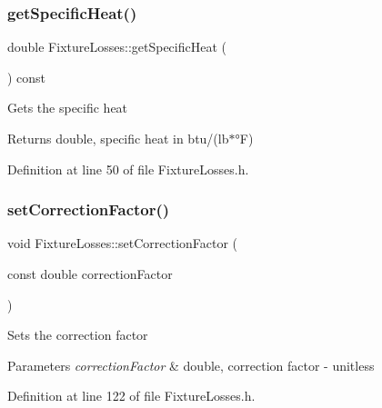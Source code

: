\subsubsection{\texorpdfstring{get\+Specific\+Heat()}{getSpecificHeat()}\hspace{0.1cm}{\footnotesize\ttfamily [3/3]}}
{\footnotesize\ttfamily double Fixture\+Losses\+::get\+Specific\+Heat (\begin{DoxyParamCaption}{ }\end{DoxyParamCaption}) const\hspace{0.3cm}{\ttfamily [inline]}}

Gets the specific heat \begin{DoxyReturn}{Returns}
double, specific heat in btu/(lb$\ast$°F) 
\end{DoxyReturn}


Definition at line 50 of file Fixture\+Losses.\+h.

\mbox{\label{class_fixture_losses_a3a3dd839d71adb630e7ce76644f18098}} 
\subsubsection{\texorpdfstring{set\+Correction\+Factor()}{setCorrectionFactor()}\hspace{0.1cm}{\footnotesize\ttfamily [1/3]}}
{\footnotesize\ttfamily void Fixture\+Losses\+::set\+Correction\+Factor (\begin{DoxyParamCaption}\item[{const double}]{correction\+Factor }\end{DoxyParamCaption})\hspace{0.3cm}{\ttfamily [inline]}}

Sets the correction factor 
\begin{DoxyParams}{Parameters}
{\em correction\+Factor} & double, correction factor -\/ unitless \\
\hline
\end{DoxyParams}


Definition at line 122 of file Fixture\+Losses.\+h.

\mbox{\label{class_fixture_losses_a3a3dd839d71adb630e7ce76644f18098}} 

